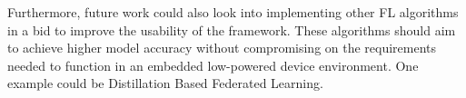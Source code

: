 \documentclass[12pt]{article}
\begin{document}
Furthermore, future work could also look into implementing other FL algorithms in a bid to improve
the usability of the framework. These algorithms should aim to achieve higher model accuracy without
compromising on the requirements needed to function in an embedded low-powered device environment.
One example could be Distillation Based Federated Learning\cite{liu2022efficient}.

\pagebreak


\end{document}
